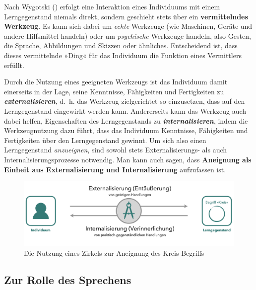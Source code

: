 \documentclass[
]{scrbook}
\theoremstyle{definition}
\theoremstyle{definition}
\theoremstyle{definition}
\theoremstyle{definition}
\theoremstyle{remark}
\begin{document}
Nach Wygotski () erfolgt eine Interaktion eines Individuums mit einem Lerngegenstand niemals direkt, sondern geschieht stets über ein \textbf{vermittelndes Werkzeug}. Es kann sich dabei um \emph{echte} Werkzeuge (wie Maschinen, Geräte und andere Hilfsmittel handeln) oder um \emph{psychische} Werkzeuge handeln, also Gesten, die Sprache, Abbildungen und Skizzen oder ähnliches. Entscheidend ist, dass dieses vermittelnde »Ding« für das Individuum die Funktion eines Vermittlers erfüllt.

Durch die Nutzung eines geeigneten Werkzeugs ist das Individuum damit einerseits in der Lage, seine Kenntnisse, Fähigkeiten und Fertigkeiten zu \textbf{\emph{externalisieren}}, d.~h. das Werkzeug zielgerichtet so einzusetzen, dass auf den Lerngegenstand eingewirkt werden kann. Andererseits kann das Werkzeug auch dabei helfen, Eigenschaften des Lerngegenstands zu \textbf{\emph{internalisieren}}, indem die Werkzeugnutzung dazu führt, dass das Individuum Kenntnisse, Fähigkeiten und Fertigkeiten über den Lerngegenstand gewinnt. Um sich also einen Lerngegenstand \emph{anzueignen}, sind sowohl stets Externalisierungs- als auch Internalisierungsprozesse notwendig. Man kann auch sagen, dass \textbf{Aneignung als Einheit aus Externalisierung und Internalisierung} aufzufassen ist.

\begin{figure}

{\centering \includegraphics[width=0.75\linewidth]{pictures/6-Aneignung} 

}

\caption{Die Nutzung eines Zirkels zur Aneignung des Kreis-Begriffs}\label{fig:SubjektObjekt2}
\end{figure}

\subsection{Zur Rolle des Sprechens}\label{zur-rolle-des-sprechens}
\end{document}
